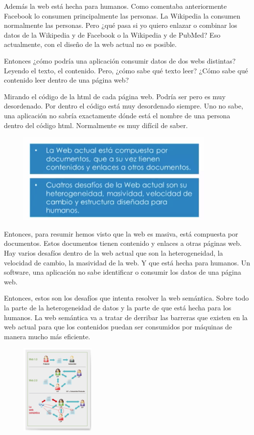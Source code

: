  Además la web está hecha para humanos. Como comentaba anteriormente Facebook lo consumen principalmente las personas. La Wikipedia la consumen normalmente las personas. Pero ¿qué pasa si yo quiero enlazar o combinar los datos de la Wikipedia y de Facebook o la Wikipedia y de PubMed? Eso actualmente, con el diseño de la web actual no es posible.
 
 Entonces ¿cómo podría una aplicación consumir datos de dos webs distintas? Leyendo el texto, el contenido. Pero, ¿cómo sabe qué texto leer? ¿Cómo sabe qué contenido leer dentro de una página web?
 
 Mirando el código de la html de cada página web. Podría ser pero es muy desordenado. Por dentro el código está muy desordenado siempre. Uno no sabe, una aplicación no sabría exactamente dónde está el nombre de una persona dentro del código html. Normalmente es muy difícil de saber.
 
  \begin{figure}[H]
 	\centering
 	\includegraphics[height=4.5cm]{imagenes/capitulo3/3}
 	\caption{}
 \end{figure}

Entonces, para resumir hemos visto que la web es masiva, está compuesta por documentos. Estos documentos tienen contenido y enlaces a otras páginas web. Hay varios desafíos dentro de la web actual que son la heterogeneidad, la velocidad de cambio, la masividad de la web. Y que está hecha para humanos. Un software, una aplicación no sabe identificar o consumir los datos de una página web.

Entonces, estos son los desafíos que intenta resolver la web semántica. Sobre todo la parte de la heterogeneidad de datos y la parte de que está hecha para los humanos. La web semántica va a tratar de derribar las barreras que existen en la web actual para que los contenidos puedan ser consumidos por máquinas de manera mucho más eficiente.



\begin{figure}[H]
	\centering
	\includegraphics[height=4.5cm]{imagenes/capitulo3/10}
	\caption{}
\end{figure}

